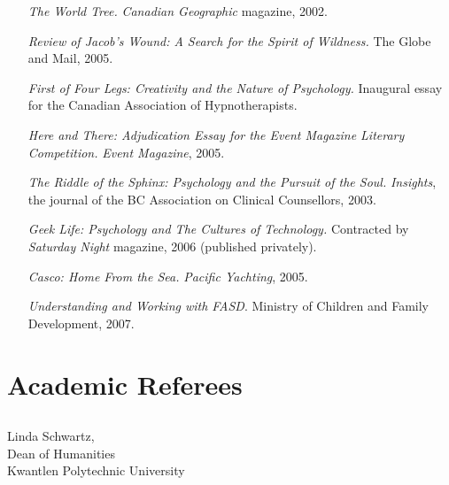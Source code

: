 \documentclass[10pt,DIV09,letterpaper,oneside,headsepline]{scrreprt}
\begin{document}
\begin{flushleft}
\begin{itemize}
\item [\textit{The World Tree.}] \textit{Canadian Geographic}
magazine, 2002.

\item [\textit{Review of \textit{Jacob's Wound: A Search for the
Spirit of Wildness}.}] The Globe and Mail, 2005.

\item [\textit{First of Four Legs: Creativity and the Nature of
Psychology.}] Inaugural essay for the Canadian Association of
Hypnotherapists.

\item [\textit{Here and There: Adjudication Essay for the Event
Magazine Literary Competition.}] \textit{Event Magazine}, 2005.

\item [\textit{The Riddle of the Sphinx: Psychology and the Pursuit
of the Soul.}] \textit{Insights}, the journal of the BC
Association on Clinical Counsellors, 2003.

\item [\textit{Geek Life: Psychology and The Cultures of
Technology.}] Contracted by \textit{Saturday Night} magazine,
2006 (published privately).

\item [\textit{Casco: Home From the Sea.}] \textit{Pacific
Yachting}, 2005.

\item [\textit{Understanding and Working with FASD}.] Ministry of
Children and Family Development, 2007.

\end{itemize}
\end{flushleft}

\chapter{Academic Referees}

\section*{}

\begin{flushleft}
Linda Schwartz,\\
Dean of Humanities\\
Kwantlen Polytechnic University\end{flushleft}
\end{document}
